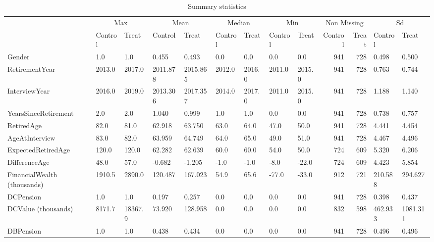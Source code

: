 \begin{table}

\caption{Summary statistics \label{tab:sum_stats}}
\centering
\begin{tabular}[t]{lllllllllrrll}
\toprule
\multicolumn{1}{c}{ } & \multicolumn{2}{c}{Max} & \multicolumn{2}{c}{Mean} & \multicolumn{2}{c}{Median} & \multicolumn{2}{c}{Min} & \multicolumn{2}{c}{Non Missing} & \multicolumn{2}{c}{Sd} \\
\cmidrule(l{3pt}r{3pt}){2-3} \cmidrule(l{3pt}r{3pt}){4-5} \cmidrule(l{3pt}r{3pt}){6-7} \cmidrule(l{3pt}r{3pt}){8-9} \cmidrule(l{3pt}r{3pt}){10-11} \cmidrule(l{3pt}r{3pt}){12-13}
 & Control & Treat & Control & Treat & Control & Treat & Control & Treat & Control & Treat & Control & Treat\\
\midrule
Gender & 1.0 & 1.0 & 0.455 & 0.493 & 0.0 & 0.0 & 0.0 & 0.0 & 941 & 728 & 0.498 & 0.500\\
RetirementYear & 2013.0 & 2017.0 & 2011.878 & 2015.865 & 2012.0 & 2016.0 & 2011.0 & 2015.0 & 941 & 728 & 0.763 & 0.744\\
InterviewYear & 2016.0 & 2019.0 & 2013.306 & 2017.357 & 2014.0 & 2017.0 & 2011.0 & 2015.0 & 941 & 728 & 1.188 & 1.140\\
YearsSinceRetirement & 2.0 & 2.0 & 1.040 & 0.999 & 1.0 & 1.0 & 0.0 & 0.0 & 941 & 728 & 0.738 & 0.757\\
RetiredAge & 82.0 & 81.0 & 62.918 & 63.750 & 63.0 & 64.0 & 47.0 & 50.0 & 941 & 728 & 4.441 & 4.454\\
\addlinespace
AgeAtInterview & 83.0 & 82.0 & 63.959 & 64.749 & 64.0 & 65.0 & 49.0 & 51.0 & 941 & 728 & 4.467 & 4.496\\
ExpectedRetiredAge & 120.0 & 120.0 & 62.282 & 62.639 & 60.0 & 60.0 & 54.0 & 50.0 & 724 & 609 & 5.320 & 6.206\\
DifferenceAge & 48.0 & 57.0 & -0.682 & -1.205 & -1.0 & -1.0 & -8.0 & -22.0 & 724 & 609 & 4.423 & 5.854\\
FinancialWealth (thousands) & 1910.5 & 2890.0 & 120.487 & 167.023 & 54.9 & 65.6 & -77.0 & -33.0 & 912 & 721 & 210.588 & 294.627\\
DCPension & 1.0 & 1.0 & 0.197 & 0.257 & 0.0 & 0.0 & 0.0 & 0.0 & 941 & 728 & 0.398 & 0.437\\
\addlinespace
DCValue (thousands) & 8171.7 & 18367.9 & 73.920 & 128.958 & 0.0 & 0.0 & 0.0 & 0.0 & 832 & 598 & 462.933 & 1081.311\\
DBPension & 1.0 & 1.0 & 0.438 & 0.434 & 0.0 & 0.0 & 0.0 & 0.0 & 941 & 728 & 0.496 & 0.496\\

\end{tabular}
\end{table}
